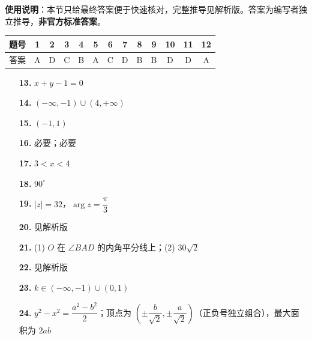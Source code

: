 
\begin{gknotice}
\textbf{使用说明}：本节只给最终答案便于快速核对，完整推导见解析版。答案为编写者独立推导，\textbf{非官方标准答案}。
\end{gknotice}

\begin{center}\begin{tabular}{ccccccccccccc}
\toprule
题号 & 1 & 2 & 3 & 4 & 5 & 6 & 7 & 8 & 9 & 10 & 11 & 12 \\
\midrule
答案 & A & D & C & B & A & C & D & B & B & D & D & A \\
\bottomrule
\end{tabular}\end{center}

\begin{itemize}[leftmargin=2.6em]
  \item[\textbf{13.}] $x+y-1=0$
  \item[\textbf{14.}] $(-\infty,-1)\cup(4,+\infty)$
  \item[\textbf{15.}] $(-1,1)$
  \item[\textbf{16.}] 必要；必要
  \item[\textbf{17.}] $3<x<4$
  \item[\textbf{18.}] $90^\circ$
\end{itemize}

\begin{itemize}[leftmargin=2.6em]
  \item[\textbf{19.}] $|z|=32$，$\arg z=\dfrac\pi3$
  \item[\textbf{20.}] 见解析版
  \item[\textbf{21.}] (1) $O$ 在 $\angle BAD$ 的内角平分线上；(2) $30\sqrt2$
  \item[\textbf{22.}] 见解析版
  \item[\textbf{23.}] $k\in(-\infty,-1)\cup(0,1)$
  \item[\textbf{24.}] $y^2-x^2=\dfrac{a^2-b^2}{2}$；顶点为 $(\pm\dfrac b{\sqrt2},\pm\dfrac a{\sqrt2})$（正负号独立组合），最大面积为 $2ab$
\end{itemize}
